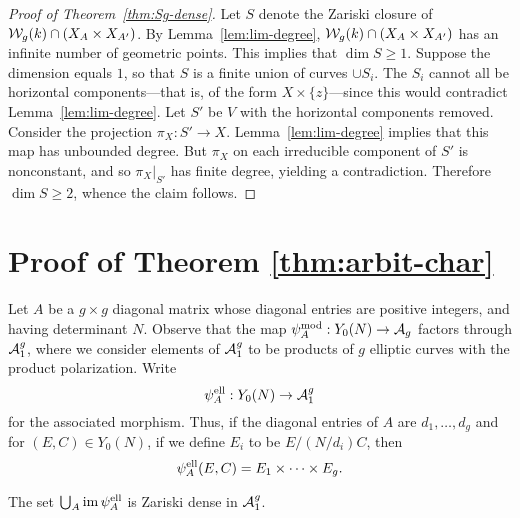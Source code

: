 \documentclass{amsart}
\begin{document}
\begin{proof}[Proof of Theorem~\ref{thm:Sg-dense}]
  Let $S$ denote the Zariski closure of $\mathcal{W}_g(k) \cap (X_A \times X_{A'})$. By Lemma~\ref{lem:lim-degree}, $\mathcal{W}_g(k) \cap (X_A \times X_{A'})$ has an infinite number of geometric points. This implies that $\dim S \geq 1$. Suppose the dimension equals $1$, so that $S$ is a finite union of curves $\cup S_i$. The $S_i$ cannot all be horizontal components---that is, of the form $X \times \{z\}$---since this would contradict Lemma~\ref{lem:lim-degree}. Let $S'$ be $V$ with the horizontal components removed. Consider the projection $\pi_X: S' \to X$. Lemma~\ref{lem:lim-degree} implies that this map has unbounded degree. But $\pi_X$ on each irreducible component of $S'$ is nonconstant, and so $\pi_X|_{S'}$ has finite degree, yielding a contradiction. Therefore $\dim S \geq 2$, whence the claim follows.
\end{proof}







\section{Proof of Theorem \ref{thm:arbit-char}}
\label{sec:characteristic-p}

Let $A$ be a $g \times g$ diagonal matrix whose diagonal entries are positive integers, and having determinant $N$. Observe that the map $\psi_{A}^\mathrm{mod}: Y_0(N) \to \mathcal{A}_g$ factors through $\mathcal{A}_1^g$, where we consider elements of $\mathcal{A}_1^g$ to be products of $g$ elliptic curves with the product polarization. Write
\[
\psi_{A}^\mathrm{ell}: Y_0(N) \to \mathcal{A}_1^g
\]
for the associated morphism. Thus, if the diagonal entries of $A$ are $d_1, \ldots, d_g$ and for $(E, C) \in Y_0(N)$, if we define $E_i$ to be $E/(N/d_i)C$, then
\[
  \psi_{A}^\mathrm{ell}(E,C) = E_1 \times \cdots \times E_g.
\]

\begin{theorem}\label{thm:char-p-version}
  The set $\bigcup_A \operatorname{im}\psi_{A}^\mathrm{ell}$ is Zariski dense in $\mathcal{A}_1^g$.
\end{theorem}
\end{document}
